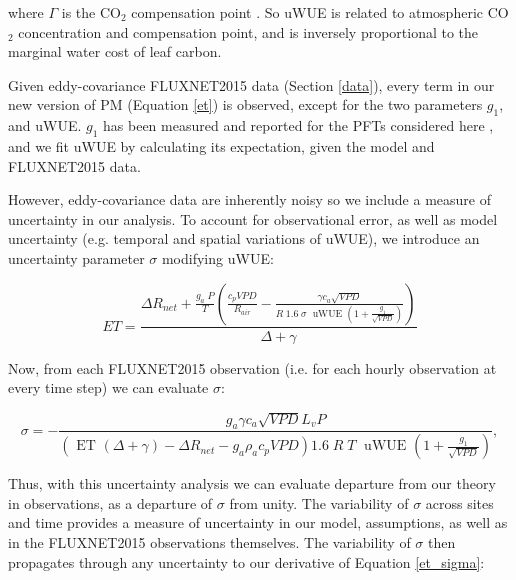 \documentclass[draft,linenumbers]{gcbjournal}
\begin{document}
where $\Gamma$ is the CO$_2$ compensation point \citep[Equation 5 in][]{Zhou_2014}. So uWUE is related to atmospheric CO$_2$ concentration and compensation point, and is inversely proportional to the marginal water cost of leaf carbon. 

Given eddy-covariance FLUXNET2015 data (Section \ref{data}), every term in our new version of PM (Equation \ref{et}) is observed, except for the two parameters $g_1$, and uWUE. $g_1$ has been measured and reported for the PFTs considered here \citep{Lin_2015, Franks_2017}, and we fit uWUE by calculating its expectation, given the model and FLUXNET2015 data.

However, eddy-covariance data are inherently noisy so we include a measure of uncertainty in our analysis. To account for observational error, as well as model uncertainty (e.g. temporal and spatial variations of uWUE), we introduce an uncertainty parameter $\sigma$ modifying uWUE:

\begin{linenomath*}
  \begin{equation}
    ET = \frac{\Delta R_{net} + \frac{g_a\; P}{T} \left( \frac{ c_p VPD}{R_{air}} -  \frac{\gamma c_a \sqrt{VPD} }{ R \; 1.6\; \sigma \; \text{ uWUE } (1 + \frac{g_1}{\sqrt{VPD}})} \right) }{ \Delta + \gamma}
    \label{et_sigma}
  \end{equation}
\end{linenomath*}

Now, from each FLUXNET2015 observation (i.e. for each hourly observation at every time step) we can evaluate $\sigma$:

\begin{linenomath*}
  \begin{equation}
\sigma = - \frac{g_a \gamma c_a \sqrt{VPD} L_v P }{ \left(\text{ ET } ( \Delta + \gamma) - \Delta R_{net} - g_a \rho_a c_p VPD\right) 1.6 \; R\; T\; \text{ uWUE } (1 + \frac{g_1}{\sqrt{VPD}})},
    \label{sigma}
  \end{equation}
\end{linenomath*}

Thus, with this uncertainty analysis we can evaluate departure from our theory in observations, as a departure of $\sigma$ from unity. The variability of $\sigma$ across sites and time provides a measure of uncertainty in our model, assumptions, as well as in the FLUXNET2015 observations themselves. The variability of $\sigma$ then propagates through any uncertainty to our derivative of Equation \ref{et_sigma}:
\end{document}
